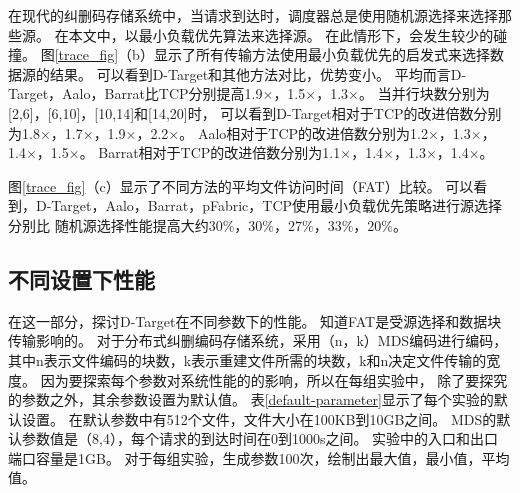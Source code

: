 在现代的纠删码存储系统中，当请求到达时，调度器总是使用随机源选择来选择那些源。
在本文中，以最小负载优先算法来选择源。
在此情形下，会发生较少的碰撞。
图\ref{trace_fig}（b）显示了所有传输方法使用最小负载优先的启发式来选择数据源的结果。
可以看到D-Target和其他方法对比，优势变小。
平均而言D-Target，Aalo，Barrat比TCP分别提高1.9$\times$，1.5$\times$，1.3$\times$。
当并行块数分别为[2,6]，[6,10]，[10,14]和[14,20]时，
可以看到D-Target相对于TCP的改进倍数分别为1.8$\times$，1.7$\times$，1.9$\times$，2.2$\times$。
Aalo相对于TCP的改进倍数分别为1.2$\times$，1.3$\times$，1.4$\times$，1.5$\times$。
Barrat相对于TCP的改进倍数分别为1.1$\times$，1.4$\times$，1.3$\times$，1.4$\times$。

图\ref{trace_fig}（c）显示了不同方法的平均文件访问时间（FAT）比较。
可以看到，D-Target，Aalo，Barrat，pFabric，TCP使用最小负载优先策略进行源选择分别比
随机源选择性能提高大约$30\%$，$30\%$，$27\%$，$33\%$，$20\%$。



\subsection{不同设置下性能}
在这一部分，探讨D-Target在不同参数下的性能。
知道FAT是受源选择和数据块传输影响的。
对于分布式纠删编码存储系统，采用（n，k）MDS编码进行编码，
其中n表示文件编码的块数，k表示重建文件所需的块数，k和n决定文件传输的宽度。
因为要探索每个参数对系统性能的的影响，所以在每组实验中，
除了要探究的参数之外，其余参数设置为默认值。
表\ref{default-parameter}显示了每个实验的默认设置。
在默认参数中有512个文件，文件大小在100KB到10GB之间。 
MDS的默认参数值是（8,4），每个请求的到达时间在0到1000s之间。
实验中的入口和出口端口容量是1GB。
对于每组实验，生成参数100次，绘制出最大值，最小值，平均值。

